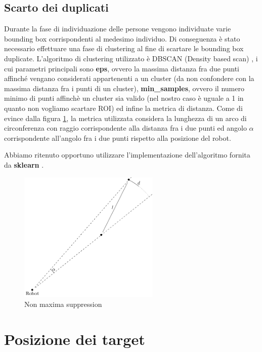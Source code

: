 \documentclass[a4paper]{article}
\begin{document}
	\subsection{Scarto dei duplicati}\label{subsec:Scarto-dei-duplicati}
	Durante la fase di individuazione delle persone vengono individuate varie bounding box corrispondenti al medesimo individuo. Di conseguenza è stato necessario effettuare una fase di clustering al fine di scartare le bounding box duplicate. L'algoritmo di clustering utilizzato è DBSCAN (Density based scan) \cite{DBSCAN}, i cui parametri principali sono \textbf{eps}, ovvero la massima distanza fra due punti affinché vengano considerati appartenenti a un cluster (da non confondere con la massima distanza fra i punti di un cluster), \textbf{min\_samples}, ovvero il numero minimo di punti affinchè un cluster sia valido (nel nostro caso è uguale a 1 in quanto non vogliamo scartare ROI) ed infine la metrica di distanza. 
	Come di evince dalla figura \ref{fig:nms}, la metrica utilizzata considera la lunghezza di un arco di circonferenza con raggio corrispondente alla distanza fra i due punti ed angolo $\alpha$ corrispondente  all'angolo fra i due punti rispetto alla posizione del robot.
	
	Abbiamo ritenuto opportuno utilizzare l'implementazione dell'algoritmo fornita da \textbf{sklearn} \cite{scikit}.
	
	\begin{figure}[H]
		\centering
		\includegraphics[width=0.6\textwidth]{./img/nms.pdf}
		\caption{Non maxima suppression}
		\label{fig:nms}
	\end{figure}
	\section{Posizione dei target}\label{sec:Posizione-dei-target}
	
\end{document}
